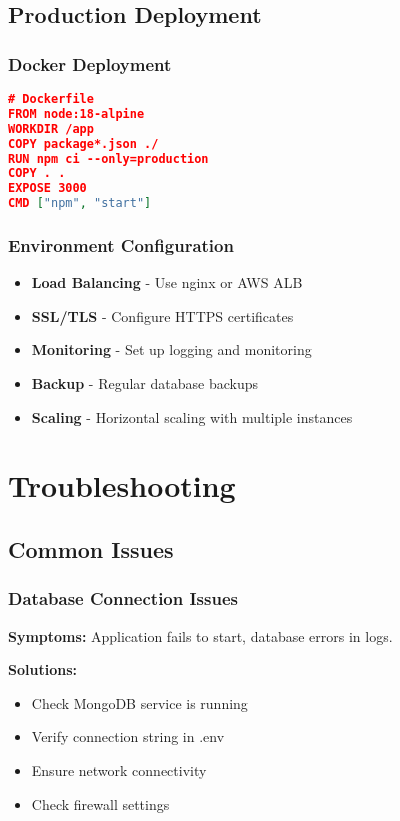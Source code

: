 \documentclass[12pt,a4paper]{article}
\newcommand{\samplecode}[1]{\begin{lstlisting}[language=JSON]#1\end{lstlisting}}
\begin{document}
\subsection{Production Deployment}

\subsubsection{Docker Deployment}
\samplecode{
# Dockerfile
FROM node:18-alpine
WORKDIR /app
COPY package*.json ./
RUN npm ci --only=production
COPY . .
EXPOSE 3000
CMD ["npm", "start"]
}

\subsubsection{Environment Configuration}
\begin{itemize}
    \item \textbf{Load Balancing} - Use nginx or AWS ALB
    \item \textbf{SSL/TLS} - Configure HTTPS certificates
    \item \textbf{Monitoring} - Set up logging and monitoring
    \item \textbf{Backup} - Regular database backups
    \item \textbf{Scaling} - Horizontal scaling with multiple instances
\end{itemize}

\section{Troubleshooting}

\subsection{Common Issues}

\subsubsection{Database Connection Issues}
\textbf{Symptoms:} Application fails to start, database errors in logs.

\textbf{Solutions:}
\begin{itemize}
    \item Check MongoDB service is running
    \item Verify connection string in .env
    \item Ensure network connectivity
    \item Check firewall settings
\end{itemize}
\end{document}
